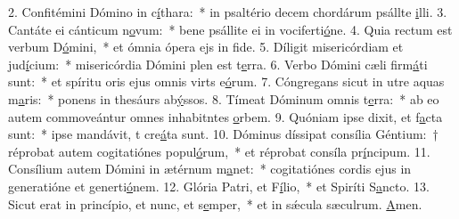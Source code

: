 2. Confitémini Dómino in c\uline{í}thara:~* in psaltério decem chordárum psállte \uline{i}lli.
3. Cantáte ei cánticum n\uline{o}vum:~* bene psállite ei in vociferti\uline{ó}ne.
4. Quia rectum est verbum D\uline{ó}mini,~* et ómnia ópera ejs in f\uline{i}de.
5. Díligit misericórdiam et jud\uline{í}cium:~* misericórdia Dómini plen est t\uline{e}rra.
6. Verbo Dómini cæli firm\uline{á}ti sunt:~* et spíritu oris ejus omnis virts e\uline{ó}rum.
7. Cóngregans sicut in utre aquas m\uline{a}ris:~* ponens in thesáurs ab\uline{ý}ssos.
8. Tímeat Dóminum omnis t\uline{e}rra:~* ab eo autem commoveántur omnes inhabitntes \uline{o}rbem.
9. Quóniam ipse dixit, et f\uline{a}cta sunt:~* ipse mandávit, t cre\uline{á}ta sunt.
10. Dóminus díssipat consília Géntium:~† réprobat autem cogitatiónes popul\uline{ó}rum,~* et réprobat consíla pr\uline{í}ncipum.
11. Consílium autem Dómini in ætérnum m\uline{a}net:~* cogitatiónes cordis ejus in generatióne et generti\uline{ó}nem.
12. Glória Patri, et F\uline{í}lio,~* et Spiríti S\uline{a}ncto.
13. Sicut erat in princípio, et nunc, et s\uline{e}mper,~* et in sǽcula sæculrum. \uline{A}men.
